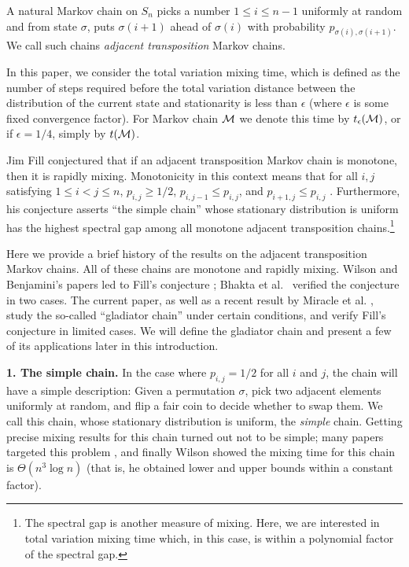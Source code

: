 \documentclass[10 pt]{article}
\begin{document}
\smallskip
A natural Markov chain on $S_n$ picks a number $1\leq i\leq n{-}1$ uniformly at random and from state $\sigma$, puts $\sigma(i{+}1)$
ahead of $\sigma(i)$ with probability $p_{\sigma(i),\sigma(i+1)}$. We call such chains \emph{adjacent transposition} Markov chains. 

\medskip 

In this paper, we consider the total variation mixing time, which is defined as the number of steps required before the total variation distance
between the distribution of the current state and stationarity is less than $\epsilon$ (where $\epsilon$ is some fixed convergence factor).
For Markov chain $\cal M$ we denote this time by $t_{\epsilon}({\cal M})$, or if $\epsilon=1/4$, simply by $t({\cal M})$.
 
\smallskip

Jim Fill \cite{FillConj} conjectured that if an adjacent transposition Markov chain is monotone, then it is rapidly mixing.
Monotonicity in this context means that for all $i,j$ satisfying $1\leq i <j  \leq n$, $p_{i,j}\geq 1/2$, $ p_{i,j-1}\leq p_{i,j}$, and 
$p_{i+1,j}\leq p_{i,j}$  \cite{FillConj}. Furthermore, his conjecture asserts ``the simple chain'' whose stationary distribution is uniform
has the highest spectral gap among all monotone adjacent transposition chains.\footnote{ The spectral gap is another measure of mixing.
Here, we are interested in total variation mixing time which, in this case, is within a polynomial factor of the spectral gap.}

\smallskip

Here we provide a brief history of the results  on the adjacent transposition Markov chains.   All of these chains are monotone and rapidly mixing.
Wilson and Benjamini's papers \cite{Wilson, Benjamini} led to Fill's conjecture \cite{FillConj}; Bhakta et al.\ \cite{Dana} verified the conjecture
in two cases.  The current paper, as well as a recent result by Miracle et al. \cite{SaraAmanda}, study the so-called ``gladiator chain'' under
certain conditions, and verify Fill's conjecture in limited cases. We will define the gladiator chain and present a few of its applications
later in this introduction. 

\medskip

 \textbf{1. The simple chain. } In the case where $p_{i,j}=1/2$ for all $i$ and $j$, the chain will have a simple description:
Given a permutation $\sigma$, pick two adjacent elements uniformly at random, and flip a fair coin to decide whether to swap them.
We call this chain, whose stationary distribution is uniform, the \emph{simple} chain. Getting precise mixing results for this chain turned
out not to be simple; many papers targeted this problem \cite{Simple1,ComparisonMethodDiaconis}, and finally Wilson \cite{Wilson} showed
the mixing time for this chain is $\Theta(n^3 \log n)$ (that is, he obtained lower and upper bounds within a constant factor).
 
\end{document}
